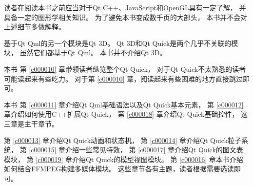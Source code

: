 读者在阅读本书之前应当对于Qt C++、JavaScript和OpenGL具有一定了解，
并具备一定的图形学相关知识。
为了避免本书变成数千页的大部头，
本书并不会对上述细节多做解释。

基于Qt Qml的另一个模块是Qt 3D。
Qt 3D和Qt Quick是两个几乎不关联的模块，
虽然它们都基于Qt Qml。
本书并不介绍Qt 3D。

本书
第 \ref{c000010} 章带领读者纵览整个Qt Quick，
对于Qt Quick不太熟悉的读者可能读起来有些吃力。
对于第 \ref{c000010} 章，阅读起来有些困难的地方直接跳过即可。

本书
第 \ref{c000011} 章介绍Qt Qml基础语法以及Qt Quick基本元素，
第 \ref{c000012} 章介绍如何使用C++扩展Qt Quick，
第 \ref{c000018} 章介绍Qt Quick基础控件，
这三章是主干章节。

第 \ref{c000013} 章介绍Qt Quick动画和状态机，
第 \ref{c000014} 章介绍Qt Quick粒子系统，
第 \ref{c000015} 章介绍一些常见特效，
第 \ref{c000017} 章介绍Qt Quick的图文表模块，
第 \ref{c000019} 章介绍Qt Quick的模型视图模块。
第 \ref{c000016} 章本书介绍如何结合FFMPEG构建多媒体模块。
这些章节各有主题，读者根据需要选读即可。













